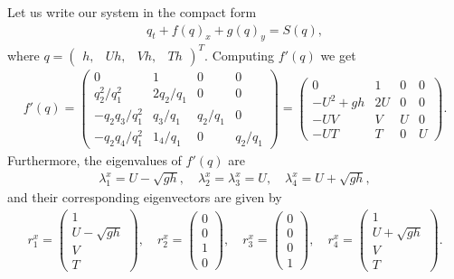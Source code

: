 \documentclass[12pt]{article}
\begin{document}
Let us write our system in the compact form 
\begin{align}
    q_t+f(q)_x+g(q)_y=S(q),
\end{align}
where 
$
q=\begin{pmatrix} h,& Uh, & Vh,& Th\end{pmatrix}^T.
$
Computing $f'(q)$ we get
\begin{align}
    f'(q)=
    \begin{pmatrix}
        0 & 1 & 0 & 0\\
        q_2^2/q_1^2 & 2q_2/q_1 & 0 & 0\\
        -q_2q_3/q_1^2 & q_3/q_1 & q_2/q_1 & 0\\
        -q_2q_4/q_1^2 & 1_4/q_1 & 0 & q_2/q_1
    \end{pmatrix}
    =\begin{pmatrix}
        0 & 1 & 0 & 0\\
        -U^2+gh & 2U & 0 & 0\\
        -UV & V & U & 0\\
        -UT & T & 0 & U
    \end{pmatrix}.
\end{align}
Furthermore, the eigenvalues of $f'(q)$ are 
\begin{align}
    \label{eq: eigenvalues f'(q)}
    \lambda^x_1=U-\sqrt{gh}, \quad \lambda^x_2=\lambda^x_3=U,\quad \lambda^x_4=U+\sqrt{gh},
\end{align}
and their corresponding eigenvectors are given by
\begin{align}
    r^x_1=
    \begin{pmatrix} 
        1\\
        U-\sqrt{gh}\\
        V\\
        T
    \end{pmatrix},
    \quad
    r^x_2=
    \begin{pmatrix} 
        0\\
        0\\
        1\\
        0
    \end{pmatrix},
    \quad
    r^x_3=
    \begin{pmatrix} 
        0\\
        0\\
        0\\
        1
    \end{pmatrix},
    \quad
    r^x_4=
    \begin{pmatrix} 
        1\\
        U+\sqrt{gh}\\
        V\\
        T
    \end{pmatrix}.
\end{align}
\end{document}
